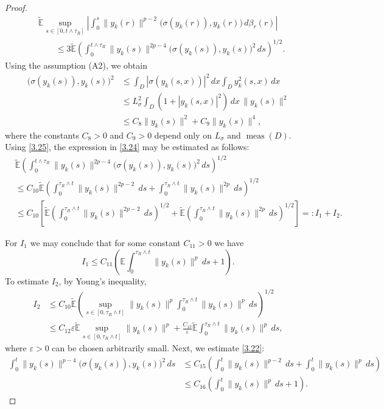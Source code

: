 \documentclass[a4paper,12pt]{article}
\numberwithin{equation}{section}
\begin{document}
\begin{proof}
\begin{align}\label{3.24}
&\widetilde{\mathbb{E}}
\sup_{s\in[0,t\wedge\tau_R]}
\left|
\int_0^s
\|y_k(r)\|^{p-2}
\bigl(
\sigma(y_k(r)),
y_k(r)
\bigr)\,d\beta_r(r)
\right|
\nonumber\\
& \qquad \leq
3\widetilde{\mathbb{E}}
\left(
\int_0^{t\wedge\tau_R}
\|y_k(s)\|^{2p-4}
\bigl(
\sigma(y_k(s)),
y_k(s)
\bigr)^2\,ds
\right)^{1/2}.
\end{align}
Using the assumption \textnormal{(A2)}, we obtain
\begin{align}
\bigl(
\sigma(y_k(s)),
y_k(s)
\bigr)^2
&\leq
\int_D
\left|
\sigma(y_k(s,x))
\right|^2\,dx
\int_D
y_k^2(s,x)\,dx
\nonumber\\
&\leq
L_\sigma^2
\int_D
\left(
1+
|y_k(s,x)|^2
\right)\,dx\,
\|y_k(s)\|^2
\nonumber\\
&\leq
C_8\|y_k(s)\|^2
+
C_9\|y_k(s)\|^4,
\label{3.25}
\end{align}
where the constants $C_8>0$ and $C_9>0$ depend only on
$L_\sigma$ and $\operatorname{meas}(D)$. Using \eqref{3.25}, the expression in \eqref{3.24} may be estimated as follows:
\begin{align}
& \widetilde{\mathbb{E}}
\left(
\int_0^{t\wedge\tau_R}
\|y_k(s)\|^{2p-4}
\bigl(
\sigma(y_k(s)),
y_k(s)
\bigr)^2\,ds
\right)^{1/2} \\
\nonumber
& \leq 
C_{10}\widetilde{\mathbb{E}}
\left(
\int_0^{\tau_R\wedge t}
\|y_k(s)\|^{2p-2}\,ds
+
\int_0^{\tau_R\wedge t}
\|y_k(s)\|^{2p}\,ds
\right)^{1/2}
\nonumber\\
& \leq
C_{10}
\left[
\widetilde{\mathbb{E}}
\left(
\int_0^{\tau_R\wedge t}
\|y_k(s)\|^{2p-2}\,ds
\right)^{1/2}
+
\widetilde{\mathbb{E}}
\left(
\int_0^{\tau_R\wedge t}
\|y_k(s)\|^{2p}\,ds
\right)^{1/2}
\right] =: I_1+I_2.
\label{3.26}
\end{align}


For $I_1$ we may conclude that for some
constant $C_{11}>0$ we have
\begin{equation}
I_1
\leq
C_{11}
\left(
\mathbb{E}
\int_0^{\tau_R\wedge t}
\|y_k(s)\|^p\,ds
+1
\right).
\label{3.27}
\end{equation}
To estimate $I_2$, by Young's inequality,
\begin{align}
I_2
&\leq
C_{10}\widetilde{\mathbb{E}}
\left(
\sup_{s\in[0,\tau_R\wedge t]}
\|y_k(s)\|^p
\int_0^{\tau_R\wedge t}
\|y_k(s)\|^p\,ds
\right)^{1/2}
\nonumber\\
&\leq
C_{12}\varepsilon
\widetilde{\mathbb{E}}
\sup_{s\in[0,\tau_R\wedge t]}
\|y_k(s)\|^p
+
\frac{C_{13}}{\varepsilon}
\widetilde{\mathbb{E}}
\int_0^{\tau_R\wedge t}
\|y_k(s)\|^p\,ds,
\label{3.28}
\end{align}
where $\varepsilon>0$ can be chosen arbitrarily small.
Next, we estimate \eqref{3.22}:
\begin{align}
\int_0^t
\|{y}_k(s)\|^{p-4}
\bigl(
\sigma({y}_k(s)),{y}_k(s)
\bigr)^2\,ds
&\leq
C_{15}
\left(
\int_0^t
\|{y}_k(s)\|^{p-2}\,ds
+
\int_0^t
\|{y}_k(s)\|^p\,ds
\right)
\nonumber\\
&\leq
C_{16}
\left(
\int_0^t
\|{y}_k(s)\|^p\,ds
+1
\right).
\label{3.29}
\end{align}


\end{proof}
\end{document}
